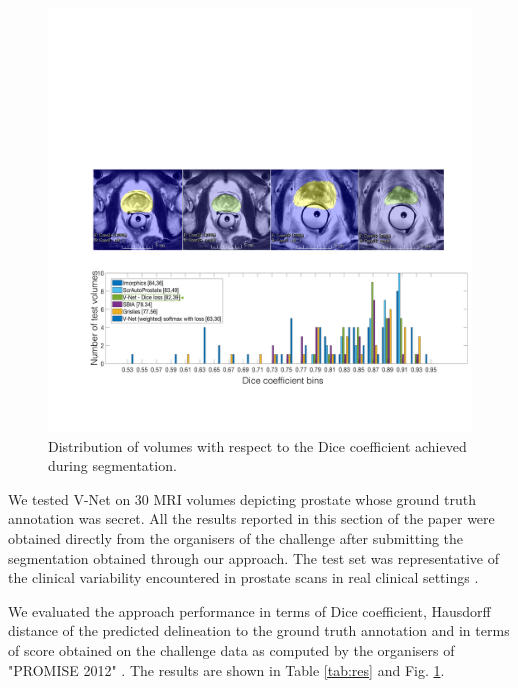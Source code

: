 \begin{figure} 	
\centering 	
\includegraphics[scale=0.19]{histogram.pdf} 	
\caption{Distribution of volumes with respect to the Dice coefficient achieved during segmentation.} 
\label{fig:hist} 
\end{figure}

We tested V-Net on $30$ MRI volumes depicting prostate whose ground truth annotation was secret. All the results reported in this section of the paper were obtained directly from the organisers of the challenge after submitting the segmentation obtained through our approach. The test set was representative of the clinical variability encountered in prostate scans in real clinical settings \cite{litjens2014evaluation}. 

We evaluated the approach performance in terms of Dice coefficient, Hausdorff distance of the predicted delineation to the ground truth annotation and in terms of score obtained on the challenge data as computed by the organisers of "PROMISE 2012" \cite{litjens2014evaluation}. The results are shown in Table \ref{tab:res} and Fig. \ref{fig:hist}.

